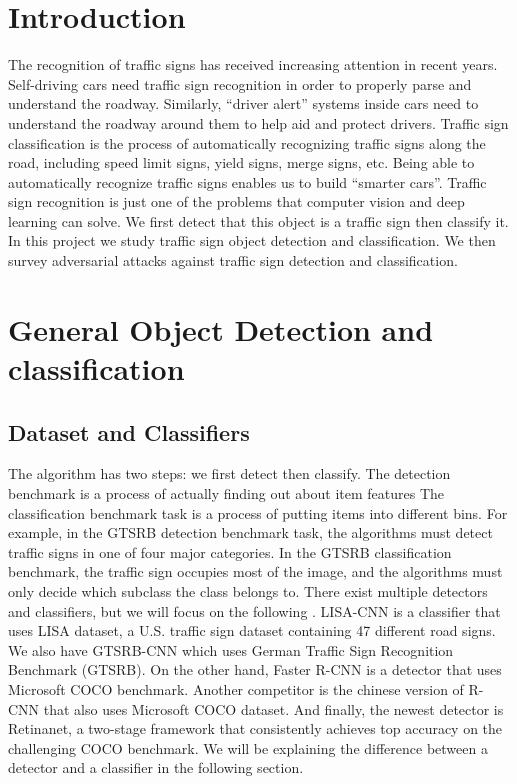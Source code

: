 \documentclass[sigconf, nonacm]{acmart}
\begin{document}
\section{Introduction}

The recognition of traffic signs has received increasing attention in recent years. Self-driving cars need traffic sign recognition in order to properly parse and understand the roadway. Similarly, “driver alert” systems inside cars need to understand the roadway around them to help aid and protect drivers. Traffic sign classification is the process of automatically recognizing traffic signs along the road, including speed limit signs, yield signs, merge signs, etc. Being able to automatically recognize traffic signs enables us to build “smarter cars”. Traffic sign recognition is just one of the problems that computer vision and deep learning can solve. We first detect that this object is a traffic sign then classify it. In this project we study traffic sign object detection and classification. We then survey adversarial attacks against traffic sign detection and classification. 

\section{ General Object Detection and classification }

\subsection{Dataset and Classifiers}
The algorithm has two steps: we first detect then classify. The detection benchmark is a process of actually finding out about item features The classification benchmark task is a process of putting items into different bins. For example, in the GTSRB detection benchmark task, the algorithms must detect traffic signs in one of four major categories. In the GTSRB classification benchmark, the traffic sign occupies most of the image, and the algorithms must only decide which subclass the class belongs to. There exist  multiple detectors and classifiers, but we will focus on the following . LISA-CNN is a classifier that uses LISA dataset, a U.S. traffic sign dataset containing 47 different road signs. We also have GTSRB-CNN which uses German Traffic Sign Recognition Benchmark (GTSRB). On the other hand, Faster R-CNN is a detector that uses Microsoft COCO benchmark. Another competitor is the chinese version of R-CNN that also uses Microsoft COCO dataset\cite{Abril03}. And finally, the newest detector is Retinanet\cite{Abril01}, a two-stage framework that consistently achieves top accuracy on the challenging COCO benchmark. We will be explaining the difference between a detector and a classifier in the following section.
\end{document}
